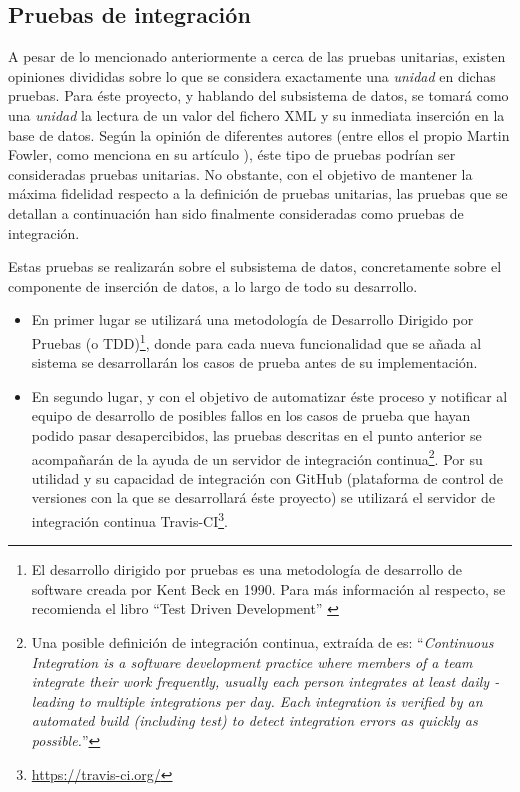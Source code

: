 \subsection{Pruebas de integración}
A pesar de lo mencionado anteriormente a cerca de las pruebas unitarias, existen opiniones divididas sobre lo que se considera exactamente una \textit{unidad} en dichas pruebas.  Para éste proyecto, y hablando del subsistema de datos, se tomará como una \textit{unidad} la lectura de un valor del fichero XML y su inmediata inserción en la base de datos.\newline
Según la opinión de diferentes autores (entre ellos el propio Martin Fowler, como menciona en su artículo \cite{mfowler:unit-testing}), éste tipo de pruebas podrían ser consideradas pruebas unitarias.  No obstante, con el objetivo de mantener la máxima fidelidad respecto a la definición de pruebas unitarias, las pruebas que se detallan a continuación han sido finalmente consideradas como pruebas de integración.

Estas pruebas se realizarán sobre el subsistema de datos, concretamente sobre el componente de inserción de datos, a lo largo de todo su desarrollo.
\begin{itemize}
\item En primer lugar se utilizará una metodología de Desarrollo Dirigido por Pruebas (o TDD)\footnote{El desarrollo dirigido por pruebas es una metodología de desarrollo de software creada por Kent Beck en 1990.  Para más información al respecto, se recomienda el libro ``Test Driven Development'' \cite{kbeck:test-driven-development}}, donde para cada nueva funcionalidad que se añada al sistema se desarrollarán los casos de prueba antes de su implementación.
\item En segundo lugar, y con el objetivo de automatizar éste proceso y notificar al equipo de desarrollo de posibles fallos en los casos de prueba que hayan podido pasar desapercibidos, las pruebas descritas en el punto anterior se acompañarán de la ayuda de un servidor de integración continua\footnote{Una posible definición de integración continua, extraída de \cite{mfowler:continuous-integration} es: ``\textit{Continuous Integration is a software development practice where members of a team integrate their work frequently, usually each person integrates at least daily - leading to multiple integrations per day. Each integration is verified by an automated build (including test) to detect integration errors as quickly as possible.}''}.  Por su utilidad y su capacidad de integración con GitHub (plataforma de control de versiones con la que se desarrollará éste proyecto) se utilizará el servidor de integración continua Travis-CI\footnote{\url{https://travis-ci.org/}}.
\end{itemize}


